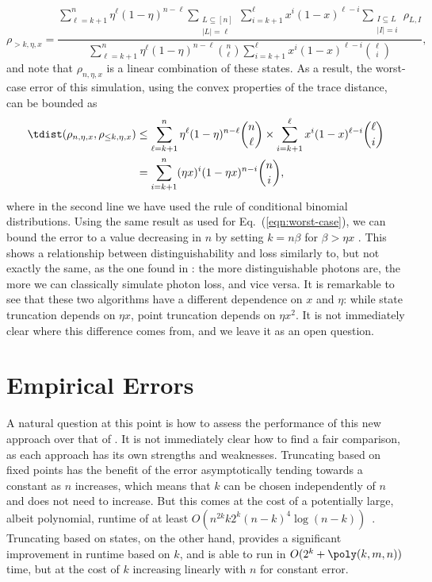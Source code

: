 \begin{equation}
\rho_{>k,\eta,x} = \frac{\sum_{\ell=k+1}^n\eta^\ell(1-\eta)^{n-\ell}\sum_{\substack{L\subseteq[n]\\|L|=\ell}}\sum_{i=k+1}^\ell x^i(1-x)^{\ell-i}\sum_{\substack{I\subseteq L\\|I|=i}}\rho_{L,I}}{\sum_{\ell=k+1}^n\eta^\ell(1-\eta)^{n-\ell}\binom{n}{\ell}\sum_{i=k+1}^\ell x^i(1-x)^{\ell-i}\binom{\ell}{i}},
\end{equation}
and note that $\rho_{n,\eta,x}$ is a linear combination of these states. 
As a result, the worst-case error of this simulation, using the convex properties of the trace distance, can be bounded as
\begin{align}
\tdist(\rho_{n,\eta,x},\rho_{\leq k,\eta,x}) &\leq \sum_{\ell=k+1}^n\eta^\ell(1-\eta)^{n-\ell}\binom{n}{\ell}\times\sum_{i=k+1}^\ell x^i(1-x)^{\ell-i}\binom{\ell}{i}\\
&=\sum_{i=k+1}^n(\eta x)^i(1-\eta x)^{n-i}\binom{n}{i}\label{eqn:lossy-worst},
\end{align}
where in the second line we have used the rule of conditional binomial distributions. 
Using the same result as used for Eq.\ (\ref{eqn:worst-case}), we can bound the error to a value decreasing in $n$ by setting $k = n\beta$ for $\beta>\eta x$ \cite{arratia1989}. 
This shows a relationship between distinguishability and loss similarly to, but not exactly the same, as the one found in \cite{renema2018loss}: the more distinguishable photons are, the more we can classically simulate photon loss, and vice versa. It is remarkable to see that these two algorithms have a different dependence on $x$ and $\eta$: while state truncation depends on $\eta x$, point truncation depends on $\eta x^2$. It is not immediately clear where this difference comes from, and we leave it as an open question.



\section{Empirical Errors}
\label{sec:empirical-errors}

A natural question at this point is how to assess the performance of this new approach over that of \cite{renema2018,renema2018loss}. 
It is not immediately clear how to find a fair comparison, as each approach has its own strengths and weaknesses. 
Truncating based on fixed points has the benefit of the error asymptotically tending towards a constant as $n$ increases, which means that $k$ can be chosen independently of $n$ and does not need to increase. 
But this comes at the cost of a potentially large, albeit polynomial, runtime of at least $O(n^{2k}k2^k(n-k)^4\log(n-k))$~\cite{renema2018,huber2008}. 
Truncating based on states, on the other hand, provides a significant improvement in runtime based on $k$, and is able to run in $O(2^k + \poly(k,m,n))$ time, but at the cost of $k$ increasing linearly with $n$ for constant error.

